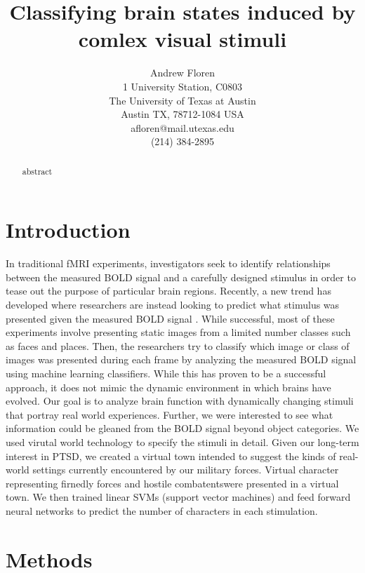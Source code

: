 \documentclass[twocolumn,final]{article}
\title{Classifying brain states induced by comlex visual stimuli}
\author{Andrew Floren\\
1 University Station, C0803\\
The University of Texas at Austin\\
Austin TX, 78712-1084 USA\\
afloren@mail.utexas.edu\\
(214) 384-2895\\}
\date{}
\begin{document}
\maketitle

\begin{abstract}
abstract
\end{abstract}

\tableofcontents

\section{Introduction}
In traditional fMRI experiments, investigators seek to identify relationships between the measured BOLD signal and a carefully designed stimulus in order to tease out the purpose of particular brain regions.
Recently, a new trend has developed where researchers are instead looking to predict what stimulus was presented given the measured BOLD signal \cite{Haxby2001,Mitchell2003,Haynes2006}.
While successful, most of these experiments involve presenting static images from a limited number classes such as faces and places.
Then, the researchers try to classify which image or class of images was presented during each frame by analyzing the measured BOLD signal using machine learning classifiers.
While this has proven to be a successful approach, it does not mimic the dynamic environment in which brains have evolved.
Our goal is to analyze brain function with dynamically changing stimuli that portray real world experiences.
Further, we were interested to see what information could be gleaned from the BOLD signal beyond object categories.
We used virutal world technology to specify the stimuli in detail.
Given our long-term interest in PTSD, we created a virtual town intended to suggest the kinds of real-world settings currently encountered by our military forces.
Virtual character representing firnedly forces and hostile combatentswere presented in a virtual town.
We then trained linear SVMs (support vector machines) and feed forward neural networks to predict the number of characters in each stimulation.

\section{Methods}
\end{document}
